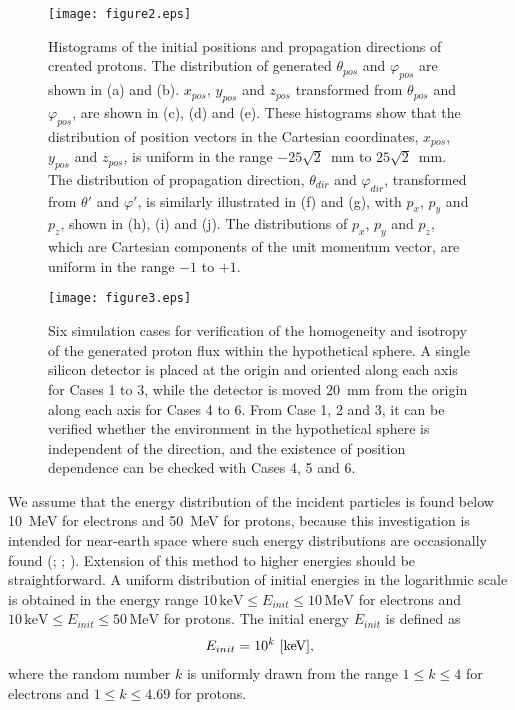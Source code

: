 \documentclass{jkas}
\begin{document}
\begin{figure}[t!]
\centering
\texttt{[image: figure2.eps]}
\caption{Histograms of the initial positions and propagation directions of created protons. The distribution of generated $\theta_{pos}$ and $\varphi_{pos}$ are shown in (a) and (b). $x_{pos}$, $y_{pos}$ and $z_{pos}$ transformed from $\theta_{pos}$ and $\varphi_{pos}$, are shown in (c), (d) and (e). These histograms show that the distribution of position vectors in the Cartesian coordinates, $x_{pos}$, $y_{pos}$ and $z_{pos}$, is uniform in the range $-25\sqrt 2$~mm to $25\sqrt2$~mm. The distribution of propagation direction, $\theta_{dir}$ and $\varphi_{dir}$, transformed from $\theta'$ and $\varphi'$, is similarly illustrated in (f) and (g), with $p_x$, $p_y$ and $p_z$, shown in (h), (i) and (j). The distributions of $p_x$, $p_y$ and $p_z$, which are Cartesian components of the unit momentum vector, are uniform in the range $-1$ to $+1$.\label{fig:fig2}}
\end{figure}

\begin{figure}[t!]
\centering
\texttt{[image: figure3.eps]}
\caption{Six simulation cases for verification of the homogeneity and isotropy of the generated proton flux within the hypothetical sphere. A single silicon detector is placed at the origin and oriented along each axis for Cases 1 to 3, while the detector is moved $20$~mm from the origin along each axis for Cases 4 to 6. From Case 1, 2 and 3, it can be verified whether the environment in the hypothetical sphere is independent of the direction, and the existence of position dependence can be checked with Cases 4, 5 and 6.\label{fig:fig3}}
\end{figure}


We assume that the energy distribution of the incident particles is found below 10~MeV for electrons and 50~MeV for protons, because this investigation is intended for near-earth space where such energy distributions are occasionally found (\citealt{piet2006}; \citealt{suparta2014}; \citealt{borovsky2017}). Extension of this method to higher energies should be straightforward. A uniform distribution of initial energies in the logarithmic scale is obtained in the energy range $10\, \mathrm{keV} \le E_{init} \le 10\, \mathrm{MeV}$ for electrons and $10\, \mathrm{keV} \le E_{init} \le 50\, \mathrm{MeV}$ for protons. The initial energy $E_{init}$ is defined as
%
\begin{eqnarray}
\label{eq:inite}
E_{init} = 10^k ~ \rm [keV],
\end{eqnarray}
%
where the random number $k$ is uniformly drawn from the range $1 \le k \le 4$ for electrons and $1 \le k \le 4.69$ for protons.
\end{document}
